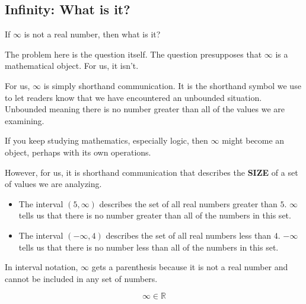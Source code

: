 \documentclass{ximera}
\begin{document}
\subsection*{Infinity: What is it?}


If $\infty$ is not a real number, then what is it?


The problem here is the question itself.  The question presupposes that $\infty$ is a mathematical object.  For us, it isn't.   

For us, $\infty$ is simply shorthand communication.  It is the shorthand symbol we use to let readers know that we have encountered an unbounded situation. Unbounded meaning there is no number greater than all of the values we are examining.


If you keep studying mathematics, especially logic, then $\infty$ might become an object, perhaps with its own operations.

However, for us, it is shorthand communication that describes the \textbf{SIZE} of a set of values we are analyzing.







\begin{example}


\begin{itemize}
\item The interval $(5, \infty)$ describes the set of all real numbers greater than $5$.  $\infty$ tells us that there is no number greater than all of the numbers in this set.



\item The interval $(-\infty, 4)$ describes the set of all real numbers less than $4$.  $-\infty$ tells us that there is no number less than all of the numbers in this set.
\end{itemize}




\end{example}
In interval notation, $\infty$ gets a parenthesis because it is not a real number and cannot be included in any set of numbers.






\begin{question}


\[  \infty \in \mathbb{R}  \]


\begin{multipleChoice}
\end{multipleChoice}


\end{question}
\end{document}
